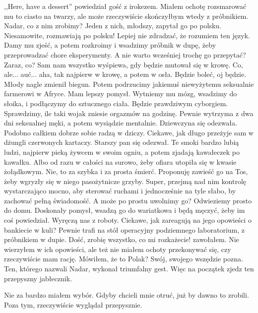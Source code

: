 \begin{dialogue}
\ds{} ,,Here, have a dessert'' \dm{} powiedział gość z irokezem. Miałem ochotę rozsmarować mu to ciasto na twarzy, ale może rzeczywiście skończyłbym wtedy z próbnikiem.
\ds{} Nadar, co z nim zrobimy? \dm{} Jeden z nich, młodszy, zapytał go po polsku. Niesamowite, rozmawiają po polsku! Lepiej nie zdradzać, że rozumiem ten język.
\ds{} Damy mu zjeść, a potem rozkroimy i wsadzimy próbnik w dupę, żeby przeprowadzać chore eksperymenty.
\ds{} A nie warto wcześniej trochę go przepytać? Zaraz, co?
\ds{} Sam nam wszystko wyśpiewa, gdy będzie mutował się w krowę.
\ds{} Co, ale... auć... aha, tak najpierw w krowę, a potem w osła. Będzie boleć, oj będzie. \dm{} Młody nagle zmienił biegun.
\ds{} Potem podrzucimy jakiemuś niewyżytemu seksualnie farmerowi w Afryce.
\ds{} Mam lepszy pomysł. Wytniemy mu mózg, wsadzimy do słoika, i podłączymy do sztucznego ciała. Będzie prawdziwym cyborgiem.
\ds{} Sprawdzimy, ile taki wojak zniesie orgazmów na godzinę. Pewnie wytrzyma z dwa dni seksualnej męki, a potem wysiądzie mentalnie. \dm{} Dziewczyna się odezwała.
\ds{} Podobno całkiem dobrze sobie radzą w dziczy. Ciekawe, jak długo przeżyje sam w dżungli czerwonych kartaczy. \dm{} Starszy pan się odezwał. \dm{}
Te smoki bardzo lubią ludzi, najpierw pieką żywcem w swoim ogniu, a potem zjadają kawałeczek po kawałku.
\ds{} Albo od razu w całości na surowo, żeby ofiara utopiła się w kwasie żołądkowym.
\ds{} Nie, to za szybka i za prosta śmierć. Proponuję zawieść go na Tos, żeby wgryzły się w niego pasożytnicze grzyby.
\ds{} Super, przejmą nad nim kontrolę wystarczająco mocno, aby sterować ruchami i jednocześnie na tyle słabo, by zachować pełną świadomość.
\ds{} A może po prostu uwolnimy go? Odwieziemy prosto do domu.
\ds{} Doskonały pomysł, wsadzą go do wariatkowa i będą męczyć, żeby im coś powiedział. Wyręczą nas z roboty. Ciekawe, jak zareagują na jego opowieści o bankiecie w kuli?
\ds{} Pewnie trafi na stół operacyjny podziemnego laboratorium, z próbnikiem w dupie.
\ds{} Dość, zrobię wszystko, co mi rozkażecie! \dm{} zawołałem. Nie wierzyłem w ich opowieści, ale też nie miałem ochoty przekonywać się, czy rzeczywiście mam rację.
\ds{} Mówiłem, że to Polak? Swój, swojego wszędzie pozna. \dm{} Ten, którego nazwali Nadar, wykonał triumfalny gest. \dm{} Więc na początek zjedz ten przepyszny jabłecznik.
\end{dialogue}

Nie za bardzo miałem wybór. 
Gdyby chcieli mnie otruć, już by dawno to zrobili.
Poza tym, rzeczywiście wyglądał przepysznie.

